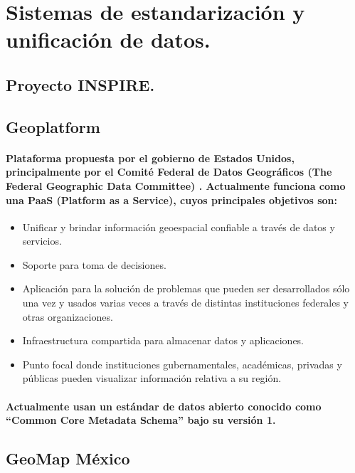 \section{Sistemas de estandarización y unificación de datos.}
  \subsection{Proyecto INSPIRE.}
    \paragraph{}
  \subsection{Geoplatform}
    \paragraph{Plataforma propuesta por el gobierno de Estados Unidos, principalmente por el Comité Federal de Datos Geográficos (The Federal Geographic Data Committee) \cite{}. Actualmente funciona como una PaaS (Platform as a Service), cuyos principales objetivos son:}
    \begin{itemize}
      \item {Unificar y brindar información geoespacial confiable a través de datos y servicios.}
      \item {Soporte para toma de decisiones.}
      \item{Aplicación para la solución de problemas que pueden ser desarrollados sólo una vez y usados varias veces a través de distintas instituciones federales y otras organizaciones.}
      \item{Infraestructura compartida para almacenar datos y aplicaciones.}
      \item{Punto focal donde instituciones gubernamentales, académicas, privadas y públicas pueden visualizar información relativa a su región.}
  \end{itemize}
  \paragraph{Actualmente usan un estándar de datos abierto conocido como “Common Core Metadata Schema” bajo su versión 1. \cite{20}}
  \subsection{GeoMap México}
    \paragraph{}
